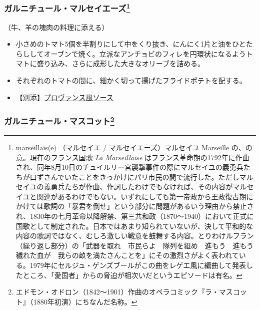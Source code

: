\begin{recette}
{\subsubsection[ガルニチュール・マルセイエーズ]{\texorpdfstring{ガルニチュール・マルセイエーズ\footnote{marseillais(e)
  （マルセイエ / マルセイエーズ）マルセイユ Marseille
  の、の意。現在のフランス国歌 \emph{La Marseillaise}
  はフランス革命期の1792年に作曲され、同年8月10日のチュイルリー宮襲撃事件の際にマルセイユの義勇兵たちが口ずさんでいたことをきっかけにパリ市民の間で流行した。ただしマルセイユの義勇兵たちが作曲、作詞したわけでもなければ、その内容がマルセイユと関連があるわけでもない。いずれにしても第一帝政から王政復古期にかけては歌詞の「暴君を倒せ」という部分に問題があるいう理由から禁止され、1830年の七月革命以降解禁、第三共和政（1870〜1940）において正式に国歌として制定された。日本ではあまり知られていないが、決して平和的な内容の歌詞ではなく、むしろ激しい戦意を鼓舞する内容。とりわけルフラン（繰り返し部分）の「武器を取れ　市民らよ　隊列を組め　進もう　進もう　穢れた血が　我らの畝を満たさんことを」にその激烈さがよく表われている。1979年にセルジュ・ゲンズブールがこの曲をレゲエ風に編曲して発表したところ、「愛国者」からの脅迫が相次いだというエピソードは有名。}}{ガルニチュール・マルセイエーズ}}\label{garniture-a-la-marseillaise}}



（牛、羊の塊肉の料理に添える）

\begin{itemize}
\item
  小さめのトマト5個を半割りにして中をくり抜き、にんにく1片と油をひとたらししてオーブンで焼く。立派なアンチョビのフィレを円環状になるようトマトに盛り込み、さらに成形した大きなオリーブを詰める。
\item
  それぞれのトマトの間に、細かく切って揚げたフライドポテトを配する。
\item
  【別添】\protect\hyperlink{sauce-provencale}{プロヴァンス風ソース}
\end{itemize}

\atoaki{}

\hypertarget{garniture-mascotte}{%
\subsubsection[ガルニチュール・マスコット]{\texorpdfstring{ガルニチュール・マスコット\footnote{エドモン・オドロン（1842〜1901）作曲のオペラコミック『ラ・マスコット』（1880年初演）にちなんだ名称。}}{ガルニチュール・マスコット}}\label{garniture-mascotte}}


\end{recette}
